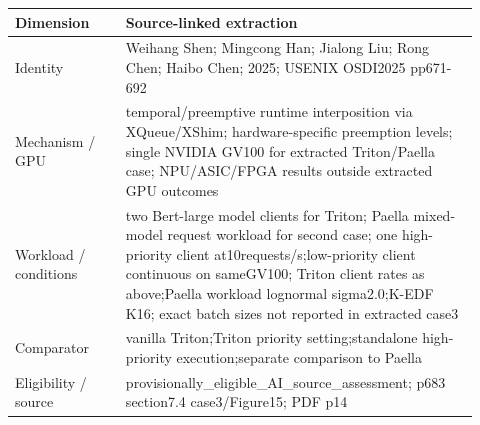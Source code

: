 \documentclass[12pt,a4paper]{article}
\begin{document}
{\small\begin{longtable}{>{\raggedright\arraybackslash}p{0.22\linewidth}>{\raggedright\arraybackslash}p{0.7\linewidth}}
\toprule
Dimension & Source-linked extraction\\\midrule
\endhead
Identity & Weihang Shen; Mingcong Han; Jialong Liu; Rong Chen; Haibo Chen; 2025; USENIX OSDI2025 pp671-692\\
Mechanism /\allowbreak{} GPU & temporal/\allowbreak{}preemptive runtime interposition via XQueue/\allowbreak{}XShim; hardware-specific preemption levels; single NVIDIA GV100 for extracted Triton/\allowbreak{}Paella case; NPU/\allowbreak{}ASIC/\allowbreak{}FPGA results outside extracted GPU outcomes\\
Workload /\allowbreak{} conditions & two Bert-large model clients for Triton; Paella mixed-model request workload for second case; one high-priority client at10requests/\allowbreak{}s;low-priority client continuous on sameGV100; Triton client rates as above;Paella workload lognormal sigma2.0;K-EDF K16; exact batch sizes not reported in extracted case3\\
Comparator & vanilla Triton;Triton priority setting;standalone high-priority execution;separate comparison to Paella\\
Eligibility /\allowbreak{} source & provisionally\_\allowbreak{}eligible\_\allowbreak{}AI\_\allowbreak{}source\_\allowbreak{}assessment; p683 section7.4 case3/\allowbreak{}Figure15; PDF p14\\
\bottomrule
\end{longtable}}
\end{document}
